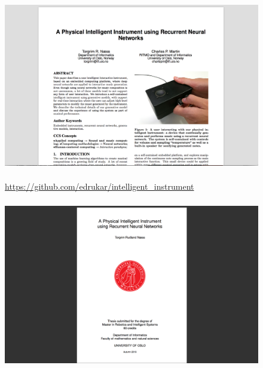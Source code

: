 \documentclass[screen, aspectratio=169]{beamer}
\begin{document}
%
\begin{frame}
\frametitle{}
 \begin{figure}
	\includegraphics[scale=0.31]{img/Torgrim-NIME-2019.png}\\
	    \cite{Naess.2019.NIME}\\
	       {\scriptsize  \url{https://github.com/edrukar/intelligent_instrument}}
   \end{figure}	
\end{frame}
%
\begin{frame}
\frametitle{}
 \begin{figure}
	\includegraphics[scale=0.3]{img/Torgrim-masterthesis-2019.png}
    \end{figure}		
\end{frame}
%
\end{document}
